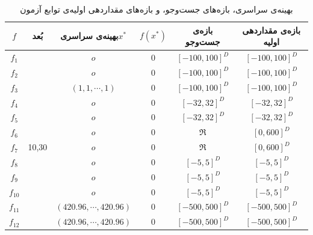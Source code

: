 \documentclass[12pt,a4paper]{article}
\theoremstyle{definition}
\theoremstyle{theorem}
\theoremstyle{definition}
\begin{document}
\renewcommand{\arraystretch}{1.5}
\noindent
\begin{table}[!htbp]
\footnotesize
\caption{\small{بهینه‌ی سراسری، بازه‌های جست‌و‌جو، و بازه‌های مقداردهی اولیه‌ی توابع آزمون}}

\centering
\begin{adjustbox}{center}

\begin{tabular}{ c c c c c c}

\hline
\hline

$f$
& 
بُعد
&
بهینه‌ی سراسری$x^*$
&
$f(x^*)$
&
بازه‌ی جست‌وجو
&
بازه‌ی مقداردهی اولیه
\tabularnewline
\hline
\rowcolor{Gray}
$f_1$
&

&
$\mathit{o}$
&
$0$
&
$[-100, 100]^D$
&
$[-100, 100]^D$
\tabularnewline
\rowcolor{LGray}
$f_2$
&

&
$\mathit{o}$
&
$0$
&
$[-100, 100]^D$
&
$[-100, 100]^D$
\tabularnewline
\rowcolor{Gray}
$f_3$
&

&
$(1,1,\cdots,1)$
&
$0$
&
$[-100, 100]^D$
&
$[-100, 100]^D$
\tabularnewline
\rowcolor{LGray}
$f_4$
&

&
$\mathit{o}$
&
$0$
&
$[-32, 32]^D$
&
$[-32, 32]^D$
\tabularnewline
\rowcolor{Gray}
$f_5$
&

&
$\mathit{o}$
&
$0$
&
$[-32, 32]^D$
&
$[-32, 32]^D$
\tabularnewline
\rowcolor{LGray}
$f_6$
&

&
$\mathit{o}$
&
$0$
&
$\mathfrak{R}$
&
$[0, 600]^D$
\tabularnewline
\rowcolor{Gray}
$f_7$
&
10,30
&
$\mathit{o}$
&
$0$
&
$\mathfrak{R}$
&
$[0, 600]^D$
\tabularnewline

\rowcolor{LGray}
$f_8$
&

&
$\mathit{o}$
&
$0$
&
$[-5,5]^D$
&
$[-5,5]^D$
\tabularnewline


\rowcolor{Gray}
$f_9$
&

&
$\mathit{o}$
&
$0$
&
$[-5,5]^D$
&
$[-5,5]^D$
\tabularnewline

\rowcolor{LGray}
$f_{10}$
&

&
$\mathit{o}$
&
$0$
&
$[-5,5]^D$
&
$[-5,5]^D$
\tabularnewline

\rowcolor{Gray}
$f_{11}$
&

&
$(420.96 , \cdots , 420.96)$
&
$0$
&
$[-500,500]^D$
&
$[-500,500]^D$
\tabularnewline


\rowcolor{LGray}
$f_{12}$
&

&
$(420.96 , \cdots , 420.96)$
&
$0$
&
$[-500,500]^D$
&
$[-500,500]^D$
\tabularnewline


\end{tabular}
\end{adjustbox}
\end{table}
\end{document}
